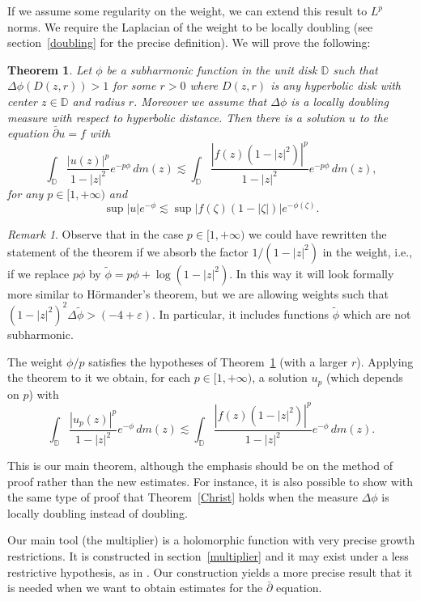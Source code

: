 \documentclass[12pt,twoside,final,psamsfonts]{amsart}
\theoremstyle{plain}
\newtheorem{teor}{Theorem}
\theoremstyle{remark}
\newtheorem*{remark}{Remark}
\theoremstyle{definition}
\newcommand{\D}{{\mathbb D}}
\newcommand{\dbar}{\bar\partial}
\begin{document}
If we assume some regularity on the weight, we can extend this result
to $L^p$ norms. We require the Laplacian of the weight to be locally
doubling (see section~\ref{doubling} for the precise definition).
We will prove the following: 

\begin{teor}\label{meu}
Let $\phi$ be a subharmonic function in the unit disk $\D$ such that 
$\Delta\phi (D(z,r))> 1$ for some $r>0$ where $D(z,r)$ is
any hyperbolic disk with center $z\in \D$ and radius $r$. Moreover we assume
that $\Delta\phi$ is a locally
doubling measure with respect to hyperbolic
distance. Then there is  a solution $u$ to the equation $\dbar u=f$ with
\[
\int_{\D} \frac {|u(z)|^p}{1-|z|^2}e^{-p\phi}\, dm(z)
\lesssim
\int_{\D}  \frac{|f(z)(1-|z|^2)|^p}{1-|z|^2} e^{-p\phi}\, dm(z),
\]
for any $p\in[1,+\infty)$ and
\[
\sup |u| e^{-\phi} \lesssim \sup |f(\zeta)(1-|\zeta|)|e^{-\phi(\zeta)}.
\]
\end{teor}

\begin{remark} Observe that in the case $p\in[1,+\infty)$ we could have
rewritten the statement of the theorem if we absorb the factor $1/(1-|z|^2)$ in
the weight, i.e., if we replace $p\phi$ by $\widetilde\phi=p\phi+\log(1-|z|^2)$.
In this way it will look formally more similar to
H\"ormander's theorem, but we are allowing weights such that
$(1-|z|^2)^2\Delta\widetilde\phi>(-4+\varepsilon)$.
In particular, it includes functions $\widetilde\phi$
which are not subharmonic.

The weight $\phi/p$ satisfies the hypotheses of Theorem~\ref{meu} (with a
larger $r$). Applying the theorem to it we obtain, for each $p\in[1,+\infty)$,
a solution $u_p$ (which depends on $p$) with
\[
\int_{\D} \frac {|u_p(z)|^p}{1-|z|^2}e^{-\phi}\, dm(z)
\lesssim
\int_{\D}  \frac{|f(z)(1-|z|^2)|^p}{1-|z|^2} e^{-\phi}\, dm(z).
\]
\end{remark}

This is our main theorem, although the emphasis should be on the method of
proof rather than the new estimates. 
For instance, it is also possible to show
with the same type of proof that Theorem~\ref{Christ} holds when the measure
$\Delta \phi$ is locally doubling instead of doubling.

Our main tool (the multiplier) is a holomorphic function with very precise
growth restrictions. It is constructed in section~\ref{multiplier} and it may
exist under a less restrictive hypothesis, as in \cite{LyuMal99}. Our 
construction yields a more precise result that it is
needed when we
want to obtain estimates for the $\dbar$ equation.
\end{document}
